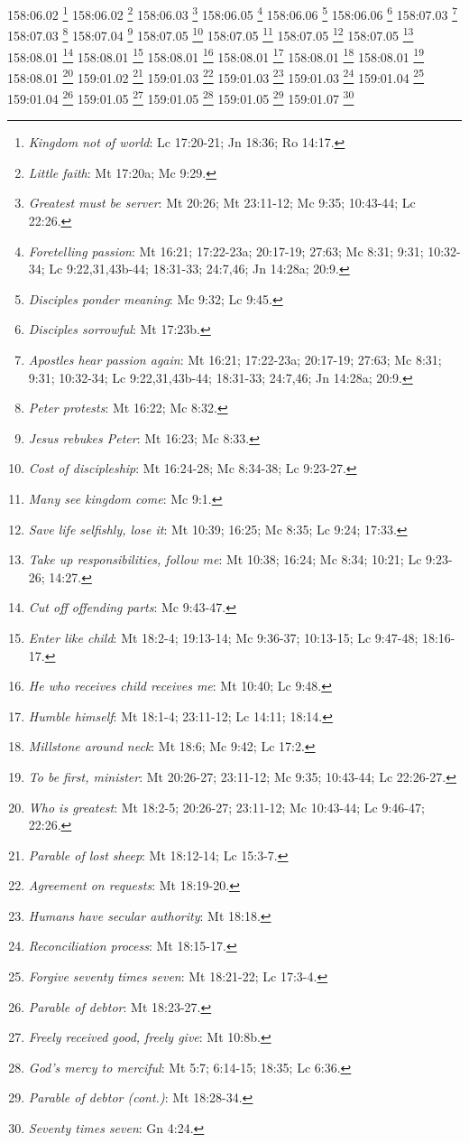 158:06.02 \footnote{\textit{Kingdom not of world}: Lc 17:20-21; Jn 18:36; Ro 14:17.}
158:06.02 \footnote{\textit{Little faith}: Mt 17:20a; Mc 9:29.}
158:06.03 \footnote{\textit{Greatest must be server}: Mt 20:26; Mt 23:11-12; Mc 9:35; 10:43-44; Lc 22:26.}
158:06.05 \footnote{\textit{Foretelling passion}: Mt 16:21; 17:22-23a; 20:17-19; 27:63; Mc 8:31; 9:31; 10:32-34; Lc 9:22,31,43b-44; 18:31-33; 24:7,46; Jn 14:28a; 20:9.}
158:06.06 \footnote{\textit{Disciples ponder meaning}: Mc 9:32; Lc 9:45.}
158:06.06 \footnote{\textit{Disciples sorrowful}: Mt 17:23b.}
158:07.03 \footnote{\textit{Apostles hear passion again}: Mt 16:21; 17:22-23a; 20:17-19; 27:63; Mc 8:31; 9:31; 10:32-34; Lc 9:22,31,43b-44; 18:31-33; 24:7,46; Jn 14:28a; 20:9.}
158:07.03 \footnote{\textit{Peter protests}: Mt 16:22; Mc 8:32.}
158:07.04 \footnote{\textit{Jesus rebukes Peter}: Mt 16:23; Mc 8:33.}
158:07.05 \footnote{\textit{Cost of discipleship}: Mt 16:24-28; Mc 8:34-38; Lc 9:23-27.}
158:07.05 \footnote{\textit{Many see kingdom come}: Mc 9:1.}
158:07.05 \footnote{\textit{Save life selfishly, lose it}: Mt 10:39; 16:25; Mc 8:35; Lc 9:24; 17:33.}
158:07.05 \footnote{\textit{Take up responsibilities, follow me}: Mt 10:38; 16:24; Mc 8:34; 10:21; Lc 9:23-26; 14:27.}
158:08.01 \footnote{\textit{Cut off offending parts}: Mc 9:43-47.}
158:08.01 \footnote{\textit{Enter like child}: Mt 18:2-4; 19:13-14; Mc 9:36-37; 10:13-15; Lc 9:47-48; 18:16-17.}
158:08.01 \footnote{\textit{He who receives child receives me}: Mt 10:40; Lc 9:48.}
158:08.01 \footnote{\textit{Humble himself}: Mt 18:1-4; 23:11-12; Lc 14:11; 18:14.}
158:08.01 \footnote{\textit{Millstone around neck}: Mt 18:6; Mc 9:42; Lc 17:2.}
158:08.01 \footnote{\textit{To be first, minister}: Mt 20:26-27; 23:11-12; Mc 9:35; 10:43-44; Lc 22:26-27.}
158:08.01 \footnote{\textit{Who is greatest}: Mt 18:2-5; 20:26-27; 23:11-12; Mc 10:43-44; Lc 9:46-47; 22:26.}
159:01.02 \footnote{\textit{Parable of lost sheep}: Mt 18:12-14; Lc 15:3-7.}
159:01.03 \footnote{\textit{Agreement on requests}: Mt 18:19-20.}
159:01.03 \footnote{\textit{Humans have secular authority}: Mt 18:18.}
159:01.03 \footnote{\textit{Reconciliation process}: Mt 18:15-17.}
159:01.04 \footnote{\textit{Forgive seventy times seven}: Mt 18:21-22; Lc 17:3-4.}
159:01.04 \footnote{\textit{Parable of debtor}: Mt 18:23-27.}
159:01.05 \footnote{\textit{Freely received good, freely give}: Mt 10:8b.}
159:01.05 \footnote{\textit{God's mercy to merciful}: Mt 5:7; 6:14-15; 18:35; Lc 6:36.}
159:01.05 \footnote{\textit{Parable of debtor (cont.)}: Mt 18:28-34.}
159:01.07 \footnote{\textit{Seventy times seven}: Gn 4:24.}
